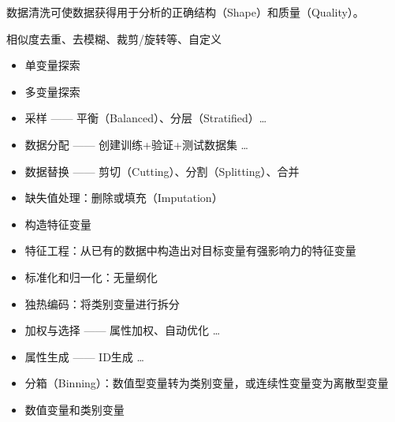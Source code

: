 \documentclass[letterpaper,10pt,english]{sphinxmanual}
\begin{document}
数据清洗可使数据获得用于分析的正确结构（Shape）和质量（Quality）。

相似度去重、去模糊、裁剪/旋转等、自定义
\begin{itemize}
\item {} 
单变量探索

\item {} 
多变量探索

\item {} 
采样 —— 平衡（Balanced）、分层（Stratified）…

\item {} 
数据分配 —— 创建训练+验证+测试数据集 …

\item {} 
数据替换 —— 剪切（Cutting）、分割（Splitting）、合并

\item {} 
缺失值处理：删除或填充（Imputation）

\item {} 
构造特征变量

\item {} 
特征工程：从已有的数据中构造出对目标变量有强影响力的特征变量

\item {} 
标准化和归一化：无量纲化

\item {} 
独热编码：将类别变量进行拆分

\item {} 
加权与选择 —— 属性加权、自动优化 …

\item {} 
属性生成 —— ID生成
…%
\begin{footnote}[385]\sphinxAtStartFootnote
{}
%
\end{footnote}

\item {} 
分箱（Binning）：数值型变量转为类别变量，或连续性变量变为离散型变量

\item {} 
数值变量和类别变量
%
\begin{footnote}[386]\sphinxAtStartFootnote
{}
%
\end{footnote}

\end{itemize}
\end{document}
